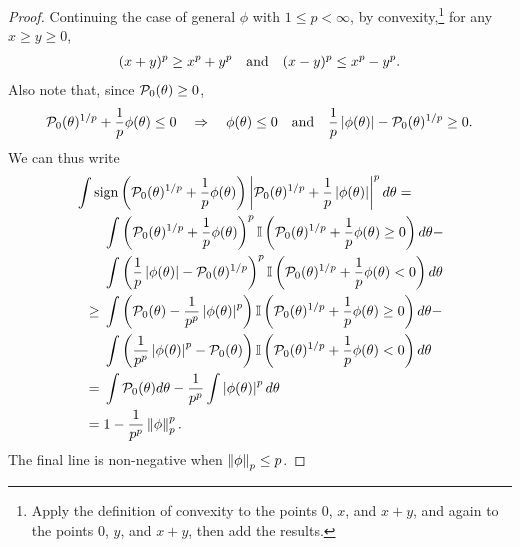 \begin{proof}
Continuing the case of general $\phi$ with $1 \le p < \infty$, by
convexity,\footnote{Apply the definition of convexity to the points $0$, $x$,
and $x + y$, and again to the points $0$, $y$, and $x+y$, then add the results.}
for any $x \ge y \ge 0$,
%
\begin{align*}
%
(x + y)^p \ge{} x^p + y^p \mathand
(x - y)^p \le{} x^p - y^p.
%
\end{align*}
%
Also note that, since $\mathcal{P}_{0}(\theta) \ge 0$,
%
\begin{align*}
%
\pbase(\theta)^{1/p} + \frac{1}{p}\phi(\theta) \le 0
\quad\Rightarrow\quad
\phi(\theta) \le 0 \mathand
\frac{1}{p} \abs{\phi(\theta)} - \pbase(\theta)^{1/p} \ge 0.
%
\end{align*}
%
We can thus write
%
\begin{align*}
%
\MoveEqLeft
\int \mathrm{sign}\left(\pbase(\theta)^{1/p} + \frac{1}{p}\phi(\theta)\right)
    \abs{\pbase(\theta)^{1/p} + \frac{1}{p}\abs{\phi(\theta)}}^{p} d\theta
={}\\&
    \int \left(\pbase(\theta)^{1/p} + \frac{1}{p}\phi(\theta)\right)^{p}
        \ind{\pbase(\theta)^{1/p} + \frac{1}{p}\phi(\theta) \ge 0}
        d\theta - \\&
    \int \left(\frac{1}{p}\abs{\phi(\theta)} - \pbase(\theta)^{1/p}\right)^{p}
        \ind{\pbase(\theta)^{1/p} + \frac{1}{p}\phi(\theta) < 0}
        d\theta
\\\ge{}&
    \int \left(\pbase(\theta) - \frac{1}{p^p}\abs{\phi(\theta)}^{p}\right)
        \ind{\pbase(\theta)^{1/p} + \frac{1}{p}\phi(\theta) \ge 0}
        d\theta - \\&
    \int \left(\frac{1}{p^p}\abs{\phi(\theta)}^p - \pbase(\theta)\right)
        \ind{\pbase(\theta)^{1/p} + \frac{1}{p}\phi(\theta) < 0}
        d\theta
\\={}&
    \int \pbase(\theta) d\theta - \frac{1}{p^p}\int \abs{\phi(\theta)}^p d\theta
\\={}&
    1 - \frac{1}{p^p} \norm{\phi}_p^p.
%
\end{align*}
%
The final line is non-negative when $\left\Vert\phi\right\Vert_p \le p$.


\end{proof}
